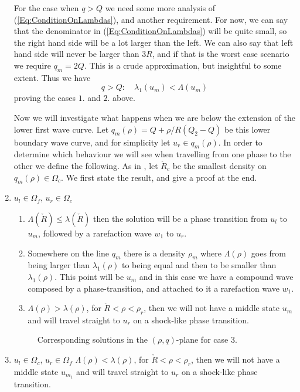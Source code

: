 \documentclass[10pt]{article}
\numberwithin{equation}{section}
\begin{document}
\begin{enumerate}
For the case when $q > Q$ we need some more analysis of (\ref{Eq:ConditionOnLambdas}), and another requirement. For now, we can say that the denominator in (\ref{Eq:ConditionOnLambdas}) will be quite small, so the right hand side will be a lot larger than the left. We can also say that left hand side will never be larger than $3R$, and if that is the worst case scenario we require $q_m = 2Q$. This is a crude approximation, but insightful to some extent. Thus we have
\begin{equation*}
  q > Q:  \quad \lambda_1(u_m) < \Lambda(u_m)
\end{equation*}
proving the cases $1.$ and $2.$ above.

Now we will investigate what happens when we are below the extension of the lower first wave curve. Let $q_m(\rho) = Q + \rho/R(Q_2 - Q)$ be this lower boundary wave curve, and for simplicity let $u_r \in q_m(\rho)$.
In order to determine which behaviour we will see when travelling from one phase to the other we define the following. As in \cite{Colombo2002}, let $\check R_c$ be the smallest density on $q_m(\rho) \in \Omega_c$. We first state the result, and give a proof at the end. 

\item $u_l \in \Omega_f$, $u_r \in \Omega_c$ 
    \begin{enumerate}
    \item $\Lambda(\check R) \leq \lambda(\check R)$ then the solution will be a phase transition from $u_l$ to $u_{m}$, followed by a rarefaction wave $w_1$ to $u_r$. 
    \item Somewhere on the line $q_m$ there is a density $\rho_m$ where $\Lambda(\rho)$ goes from being larger than $\lambda_1(\rho)$ to being equal and then to be smaller than $\lambda_1(\rho)$. This point will be $u_{m}$ and in this case we have a compound wave composed by a phase-transition, and attached to it a rarefaction wave $w_1$. 
    \item $ \Lambda( \rho) > \lambda(\rho)$, for $\check R < \rho < \rho_r$, then we will not have a middle state $u_{m}$ and will travel straight to $u_r$ on a shock-like phase transition.
    \end{enumerate}
\begin{figure}[H]
    \centering
    
    \caption{Corresponding solutions in the $(\rho, q)$-plane for case $3.$}
    \label{fig:PhTComplexCase1}
\end{figure}
 
\item $u_l \in \Omega_c$, $u_r \in \Omega_f$ \newline
     $ \Lambda( \rho) < \lambda(\rho)$, for $\check R < \rho < \rho_r$, then we will not have a middle state $u_{m_1}$ and will travel straight to $u_r$ on a shock-like phase transition.
\end{enumerate}
\end{document}
